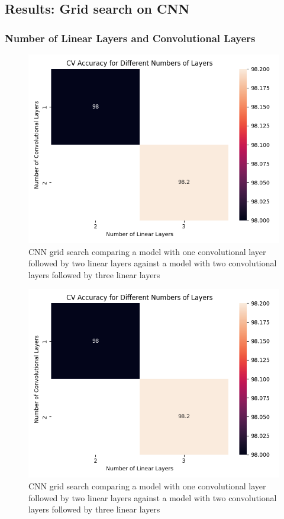 \subsection{Results: Grid search on CNN}

\subsubsection{Number of Linear Layers and Convolutional Layers}
\begin{figure}[H]
    \centering
    \includegraphics[width=\textwidth]{results/cnn_grid_search/heatmap_grid_search_layers.png}
    \caption{CNN grid search comparing a model with one convolutional layer followed by two linear layers against a model with two convolutional layers followed by three linear layers}
    \label{fig:LogRegEpochs}
\end{figure}

\begin{figure}[H]
    \centering
    \includegraphics[width=\textwidth]{results/cnn_grid_search/heatmap_grid_search_layers.png}
    \caption{CNN grid search comparing a model with one convolutional layer followed by two linear layers against a model with two convolutional layers followed by three linear layers}
    \label{fig:LogRegEpochs}
\end{figure}


